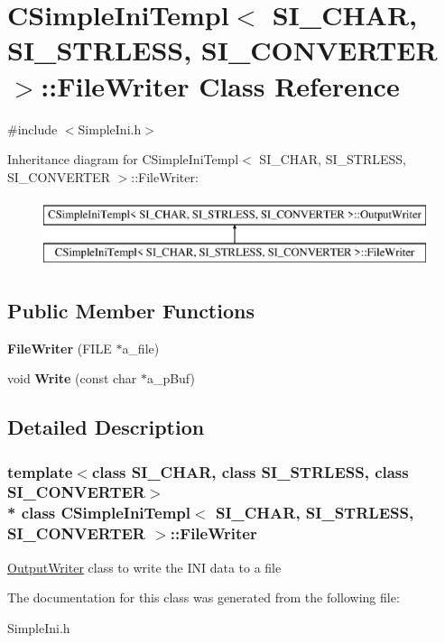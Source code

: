 \hypertarget{a00102}{}\section{C\+Simple\+Ini\+Templ$<$ S\+I\+\_\+\+C\+H\+AR, S\+I\+\_\+\+S\+T\+R\+L\+E\+SS, S\+I\+\_\+\+C\+O\+N\+V\+E\+R\+T\+ER $>$\+:\+:File\+Writer Class Reference}
\label{a00102}


{\ttfamily \#include $<$Simple\+Ini.\+h$>$}

Inheritance diagram for C\+Simple\+Ini\+Templ$<$ S\+I\+\_\+\+C\+H\+AR, S\+I\+\_\+\+S\+T\+R\+L\+E\+SS, S\+I\+\_\+\+C\+O\+N\+V\+E\+R\+T\+ER $>$\+:\+:File\+Writer\+:\begin{figure}[H]
\begin{center}
\leavevmode
\includegraphics[height=2.000000cm]{a00102}
\end{center}
\end{figure}
\subsection*{Public Member Functions}
\begin{DoxyCompactItemize}
\item 
{\bfseries File\+Writer} (F\+I\+LE $\ast$a\+\_\+file)\hypertarget{a00102_aecd4d79480c9b4e70b598c10014856f8}{}\label{a00102_aecd4d79480c9b4e70b598c10014856f8}

\item 
void {\bfseries Write} (const char $\ast$a\+\_\+p\+Buf)\hypertarget{a00102_ae8885b97884ef9dd5bf074bc4f011373}{}\label{a00102_ae8885b97884ef9dd5bf074bc4f011373}

\end{DoxyCompactItemize}


\subsection{Detailed Description}
\subsubsection*{template$<$class S\+I\+\_\+\+C\+H\+AR, class S\+I\+\_\+\+S\+T\+R\+L\+E\+SS, class S\+I\+\_\+\+C\+O\+N\+V\+E\+R\+T\+ER$>$\\*
class C\+Simple\+Ini\+Templ$<$ S\+I\+\_\+\+C\+H\+A\+R, S\+I\+\_\+\+S\+T\+R\+L\+E\+S\+S, S\+I\+\_\+\+C\+O\+N\+V\+E\+R\+T\+E\+R $>$\+::\+File\+Writer}

\hyperlink{a00229}{Output\+Writer} class to write the I\+NI data to a file 

The documentation for this class was generated from the following file\+:\begin{DoxyCompactItemize}
\item 
Simple\+Ini.\+h\end{DoxyCompactItemize}
